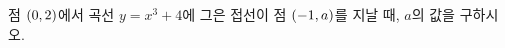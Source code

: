 점 $(0{,}\mkern3mu\mathopen{}2)$에서 곡선 $y=x^3+4$에 그은 접선이 점 $(-1{,}\mkern3mu\mathopen{}a)$를 지날 때, $a$의 값을 구하시오.

